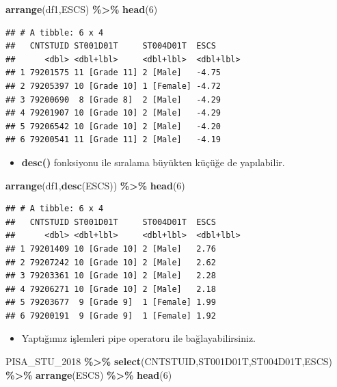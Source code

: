 \documentclass[
  oneside]{book}
\newenvironment{Shaded}{\begin{snugshade}}{\end{snugshade}}
\newcommand{\DecValTok}[1]{\textcolor[rgb]{0.00,0.00,0.81}{#1}}
\newcommand{\FunctionTok}[1]{\textcolor[rgb]{0.13,0.29,0.53}{\textbf{#1}}}
\newcommand{\NormalTok}[1]{#1}
\newcommand{\SpecialCharTok}[1]{\textcolor[rgb]{0.81,0.36,0.00}{\textbf{#1}}}
\providecommand{\tightlist}{%
  \setlength{\itemsep}{0pt}\setlength{\parskip}{0pt}}
\begin{document}
\begin{Shaded}
\begin{Highlighting}[]
\FunctionTok{arrange}\NormalTok{(df1,ESCS) }\SpecialCharTok{\%\textgreater{}\%} \FunctionTok{head}\NormalTok{(}\DecValTok{6}\NormalTok{)}
\end{Highlighting}
\end{Shaded}

\begin{verbatim}
## # A tibble: 6 x 4
##   CNTSTUID ST001D01T     ST004D01T  ESCS     
##      <dbl> <dbl+lbl>     <dbl+lbl>  <dbl+lbl>
## 1 79201575 11 [Grade 11] 2 [Male]   -4.75    
## 2 79205397 10 [Grade 10] 1 [Female] -4.72    
## 3 79200690  8 [Grade 8]  2 [Male]   -4.29    
## 4 79201907 10 [Grade 10] 2 [Male]   -4.29    
## 5 79206542 10 [Grade 10] 2 [Male]   -4.20    
## 6 79200541 11 [Grade 11] 2 [Male]   -4.19
\end{verbatim}

\begin{itemize}
\tightlist
\item
  \textbf{desc()} fonksiyonu ile sıralama büyükten küçüğe de yapılabilir.
\end{itemize}

\begin{Shaded}
\begin{Highlighting}[]
\FunctionTok{arrange}\NormalTok{(df1,}\FunctionTok{desc}\NormalTok{(ESCS)) }\SpecialCharTok{\%\textgreater{}\%} \FunctionTok{head}\NormalTok{(}\DecValTok{6}\NormalTok{)}
\end{Highlighting}
\end{Shaded}

\begin{verbatim}
## # A tibble: 6 x 4
##   CNTSTUID ST001D01T     ST004D01T  ESCS     
##      <dbl> <dbl+lbl>     <dbl+lbl>  <dbl+lbl>
## 1 79201409 10 [Grade 10] 2 [Male]   2.76     
## 2 79207242 10 [Grade 10] 2 [Male]   2.62     
## 3 79203361 10 [Grade 10] 2 [Male]   2.28     
## 4 79206271 10 [Grade 10] 2 [Male]   2.18     
## 5 79203677  9 [Grade 9]  1 [Female] 1.99     
## 6 79200191  9 [Grade 9]  1 [Female] 1.92
\end{verbatim}

\begin{itemize}
\tightlist
\item
  Yaptığımız işlemleri pipe operatoru ile bağlayabilirsiniz.
\end{itemize}

\begin{Shaded}
\begin{Highlighting}[]
\NormalTok{PISA\_STU\_2018 }\SpecialCharTok{\%\textgreater{}\%}
  \FunctionTok{select}\NormalTok{(CNTSTUID,ST001D01T,ST004D01T,ESCS) }\SpecialCharTok{\%\textgreater{}\%}
  \FunctionTok{arrange}\NormalTok{(ESCS) }\SpecialCharTok{\%\textgreater{}\%}
  \FunctionTok{head}\NormalTok{(}\DecValTok{6}\NormalTok{)}
\end{Highlighting}
\end{Shaded}
\end{document}
